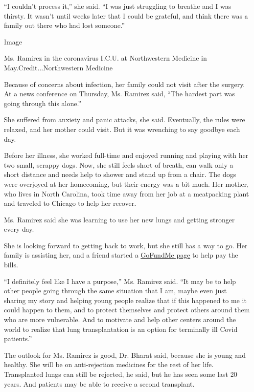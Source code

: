 ``I couldn't process it,'' she said. ``I was just struggling to breathe
and I was thirsty. It wasn't until weeks later that I could be grateful,
and think there was a family out there who had lost someone.''

Image

Ms. Ramirez in the coronavirus I.C.U. at Northwestern Medicine in
May.Credit...Northwestern Medicine

Because of concerns about infection, her family could not visit after
the surgery. At a news conference on Thursday, Ms. Ramirez said, ``The
hardest part was going through this alone.''

She suffered from anxiety and panic attacks, she said. Eventually, the
rules were relaxed, and her mother could visit. But it was wrenching to
say goodbye each day.

Before her illness, she worked full-time and enjoyed running and playing
with her two small, scrappy dogs. Now, she still feels short of breath,
can walk only a short distance and needs help to shower and stand up
from a chair. The dogs were overjoyed at her homecoming, but their
energy was a bit much. Her mother, who lives in North Carolina, took
time away from her job at a meatpacking plant and traveled to Chicago to
help her recover.

Ms. Ramirez said she was learning to use her new lungs and getting
stronger every day.

She is looking forward to getting back to work, but she still has a way
to go. Her family is assisting her, and a friend started a
\href{https://www.gofundme.com/f/covid19-lung-transplant?utm_source=customer\&utm_campaign=p_cp+share-sheet\&utm_medium=copy_link-tip}{GoFundMe
page} to help pay the bills.

``I definitely feel like I have a purpose,'' Ms. Ramirez said. ``It may
be to help other people going through the same situation that I am,
maybe even just sharing my story and helping young people realize that
if this happened to me it could happen to them, and to protect
themselves and protect others around them who are more vulnerable. And
to motivate and help other centers around the world to realize that lung
transplantation is an option for terminally ill Covid patients.''

The outlook for Ms. Ramirez is good, Dr. Bharat said, because she is
young and healthy. She will be on anti-rejection medicines for the rest
of her life. Transplanted lungs can still be rejected, he said, but he
has seen some last 20 years. And patients may be able to receive a
second transplant.

